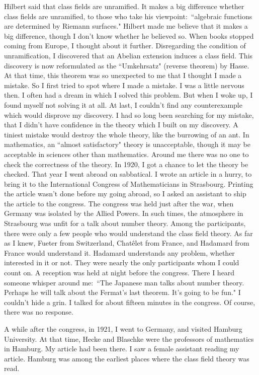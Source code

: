 \documentclass[11pt,a4j,twocolumn]{jarticle}
\begin{document}
Hilbert said that class fields are unramified.
It makes a big difference whether class fields are unramified,
to those who take his viewpoint:\ ``algebraic functions are determined by Riemann surfaces."
Hilbert made me believe that it makes a big difference,
though I don't know whether he believed so.
When books stopped coming from Europe, I thought about it further.
Disregarding the condition of unramification,
I discovered that an Abelian extension induces a class field.
This discovery is now reformulated as the ``Umkehrsatz" (reverse theorem) by Hasse.
At that time, this theorem was so unexpected to me that I thought I made a mistake.
So I first tried to spot where I made a mistake. I was a little nervous then.
I often had a dream in which I solved this problem.
But when I woke up, I found myself not solving it at all.
At last, I couldn't find any counterexample which would disprove my discovery.
I had so long been searching for my mistake,
that I didn't have confidence in the theory which I built on my discovery.
A tiniest mistake would destroy the whole theory, like the burrowing of an ant.
In mathematics, an ``almost satisfactory" theory is unacceptable,
though it may be acceptable in sciences other than mathematics.
Around me there was no one to check the correctness of the theory.
In 1920, I got a chance to let the theory be checked.
That year I went abroad on sabbatical.
I wrote an article in a hurry, to bring it to the International Congress of Mathematicians in Strasbourg.
Printing the article wasn't done before my going abroad,
so I asked an assistant to ship the article to the congress.
The congress was held just after the war,
when Germany was isolated by the Allied Powers.
In such times, the atmosphere in Strasbourg was unfit for a talk about number theory.
Among the participants, there were only a few people who would understand the class field theory.
As far as I knew, Fueter from Switzerland, Chat\^elet from France, and Hadamard from France
would understand it. Hadamard understands any problem, whether interested in it or not.
They were nearly the only participants whom I could count on.
A reception was held at night before the congress.
There I heard someone whisper around me:\ ``The Japanese man talks about number theory.
Perhaps he will talk about the Fermat's last theorem. It's going to be fun."
I couldn't hide a grin. I talked for about fifteen minutes in the congress.
Of course, there was no response.

A while after the congress, in 1921, I went to Germany, and visited Hamburg University.
At that time, Hecke and Blaschke were the professors of mathematics in Hamburg.
My article had been there. I saw a female assistant reading my article.
Hamburg was among the earliest places where the class field theory was read.
\end{document}
